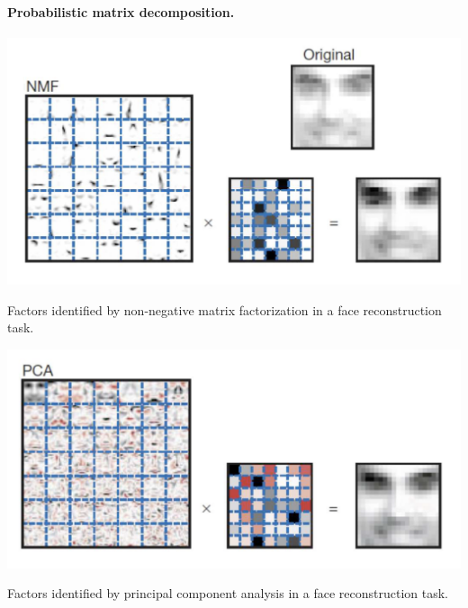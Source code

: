 \paragraph{Probabilistic matrix decomposition.}

\begin{marginfigure}
    \centering
    \includegraphics[width=\textwidth]{figures/nmf_face}
    \caption{Factors identified by non-negative matrix factorization in a face reconstruction task.}
    \label{fig:nmf}
\end{marginfigure}

\begin{marginfigure}
    \centering
    \includegraphics[width=\textwidth]{figures/pca_face}
    \caption{Factors identified by principal component analysis in a face reconstruction task.}
    \label{fig:pca}
\end{marginfigure}


